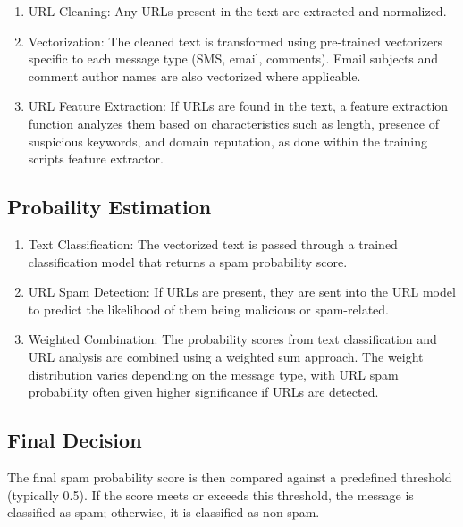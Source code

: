 \documentclass{article}
\begin{document}
\begin{enumerate}
    \item URL Cleaning: Any URLs present in the text are extracted and normalized.
    \item Vectorization: The cleaned text is transformed using pre-trained vectorizers specific to each message type (SMS, email, comments). Email subjects and comment author names are also vectorized where applicable.
    \item URL Feature Extraction: If URLs are found in the text, a feature extraction function analyzes them based on characteristics such as length, presence of suspicious keywords, and domain reputation, as done within the training scripts feature extractor.
\end{enumerate}

\subsection{Probaility Estimation}

\begin{enumerate}
    \item Text Classification: The vectorized text is passed through a trained classification model that returns a spam probability score.
    \item URL Spam Detection: If URLs are present, they are sent into the URL model to predict the likelihood of them being malicious or spam-related.
    \item Weighted Combination: The probability scores from text classification and URL analysis are combined using a weighted sum approach. The weight distribution varies depending on the message type, with URL spam probability often given higher significance if URLs are detected.
\end{enumerate}

\subsection{Final Decision}

The final spam probability score is then compared against a predefined threshold (typically 0.5). If the score meets or exceeds this threshold, the message is classified as spam; otherwise, it is classified as non-spam.




\newpage
\end{document}
